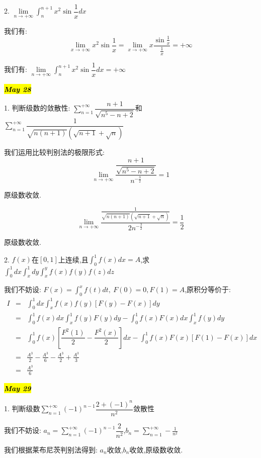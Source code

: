 2. $\lim\limits_{n\rightarrow +\infty}\int_{n}^{n+1}x^2\sin\dfrac{1}{x}dx$
\begin{solution}
	
	我们有: 
	$$\lim\limits_{x\rightarrow +\infty}x^2\sin\frac{1}{x}=\lim\limits_{x\rightarrow +\infty}x\dfrac{\sin\frac{1}{x}}{\frac{1}{x}}=+\infty$$
	
	我们有: $\lim\limits_{n\rightarrow +\infty}\int_{n}^{n+1}x^2\sin\dfrac{1}{x}dx=+\infty$
\end{solution}

\hl{\textbf{\textit{May 28}}}

1. 判断级数的敛散性: $\sum\limits_{n=1}^{+\infty}\dfrac{n+1}{\sqrt{n^5-n+2}}$和$\sum\limits_{n=1}^{+\infty}\dfrac{1}{\sqrt{n(n+1)}(\sqrt{n+1}+\sqrt{n})}$
\begin{solution}
	
	我们运用比较判别法的极限形式: 
	$$\lim\limits_{n\rightarrow +\infty}\dfrac{\dfrac{n+1}{\sqrt{n^5-n+2}}}{n^{-\frac{3}{2}}}=1$$
	
	原级数收敛.
	
	$$\lim\limits_{n\rightarrow +\infty}\dfrac{\frac{1}{\sqrt{n(n+1)}(\sqrt{n+1}+\sqrt{n})}}{2n^{-\frac{3}{2}}}=\frac{1}{2}$$
	
	原级数收敛.
\end{solution}

2. $f(x)$在$[0,1]$上连续,且$\int_{0}^{1}f(x)dx=A$,求$\int_{0}^{1}dx\int_{x}^{1}dy\int_{x}^{y}f(x)f(y)f(z)dz$
\begin{solution}
	
	我们不妨设: $F(x)=\int_{0}^{x}f(t)dt,\ F(0)=0,F(1)=A$,原积分等价于: 
	\begin{eqnarray*}
		I&=&\int_{0}^{1}dx\int_{x}^{1}f(x)f(y)[F(y)-F(x)]dy\\
		&=&\int_{0}^{1}f(x)dx\int_{x}^{1}f(y)F(y)dy-\int_{0}^{1}f(x)F(x)dx\int_{x}^{1}f(y)dy\\
		&=&\int_{0}^{1}f(x)[\dfrac{F^2(1)}{2}-\dfrac{F^2(x)}{2}]dx-\int_{0}^{1}f(x)F(x)[F(1)-F(x)]dx\\
		&=&\frac{A^3}{2}-\frac{A^3}{6}-\frac{A^3}{2}+\frac{A^3}{3}\\
		&=&\frac{A^3}{6}
	\end{eqnarray*}
\end{solution}

\hl{\textbf{\textit{May 29}}}

1. 判断级数$\sum\limits_{n=1}^{+\infty}(-1)^{n-1}\dfrac{2+(-1)^n}{n^2}$敛散性
\begin{solution}
	
	我们不妨设: $a_{n}=\sum\limits_{n=1}^{+\infty}(-1)^{n-1}\dfrac{2}{n^2}$,$b_{n}=\sum\limits_{n=1}^{+\infty}-\frac{1}{n^2}$
	
	我们根据莱布尼茨判别法得到: 
	$a_{n}$收敛,$b_{n}$收敛,原级数收敛.
\end{solution}

